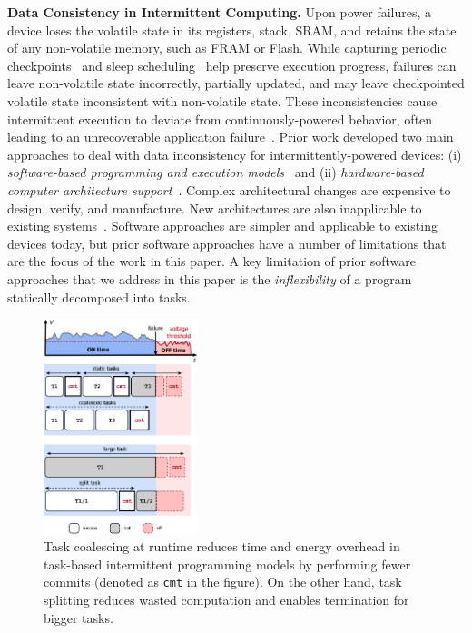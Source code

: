 \textbf{Data Consistency in Intermittent Computing.}  
Upon power failures, a device loses the volatile
state in its registers, stack, SRAM, and retains the state of any non-volatile
memory, such as FRAM or Flash. While capturing periodic
checkpoints~\citep{mementos,quickrecall} and sleep
scheduling~\citep{dewdrop,hibernus,hibernusplusplus} help preserve execution
progress, failures can leave non-volatile state incorrectly, partially updated,
and may leave checkpointed volatile state inconsistent with non-volatile state.
These inconsistencies cause intermittent execution to deviate from
continuously-powered behavior, often leading to an unrecoverable
application failure~\citep{dino,edb}. Prior work developed two main approaches to deal with data inconsistency for
intermittently-powered devices: (i) \emph{software-based programming and
execution models}~\citep{dino,ratchet,chain,alpaca} and (ii)
\emph{hardware-based computer architecture
support}~\citep{hicks_isca_2017,idetic,nvp}. Complex architectural changes are
expensive to design, verify, and manufacture. New architectures are also
inapplicable to existing systems~\citep{hicks_isca_2017,nvp}. Software
approaches are simpler and applicable to existing devices today, but prior
software approaches have a number of limitations that are the focus of the work
in this paper. A key limitation of prior software approaches that we address in this paper is the {\em inflexibility} of a program statically decomposed into tasks. 

\begin{figure}
    \centering
    \includegraphics[width=0.4\textwidth]{figures/intro-figure.pdf}
    \caption{Task coalescing at runtime reduces time and energy overhead in task-based intermittent programming models by performing fewer commits (denoted as \texttt{cmt} in the figure). On the other hand, task splitting reduces wasted computation and enables termination for bigger tasks.}
    \label{fig:coalesce}
\end{figure}

